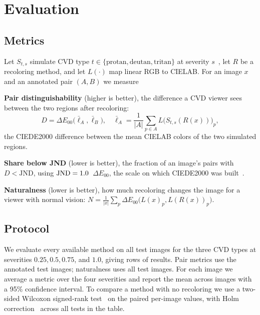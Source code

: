 \section{Evaluation}
\label{sec:evaluation}

\subsection{Metrics}
Let $S_{t,s}$ simulate CVD type $t\in\{\text{protan},\text{deutan},\text{tritan}\}$ at
severity $s$~\cite{machado2009}, let $R$ be a recoloring method, and let $L(\cdot)$ map linear
RGB to CIELAB. For an image $x$ and an annotated pair $(A,B)$ we measure

\noindent\textbf{Pair distinguishability} (higher is better), the difference a CVD viewer sees
between the two regions after recoloring:
\begin{equation}
  D = \Delta E_{00}\big(\bar{\ell}_A, \bar{\ell}_B\big),\quad
  \bar{\ell}_A = \frac{1}{|A|}\sum_{p\in A} L\big(S_{t,s}(R(x))\big)_p ,
\end{equation}
the CIEDE2000 difference between the mean CIELAB colors of the two simulated regions.

\noindent\textbf{Share below JND} (lower is better), the fraction of an image's pairs with
$D<\text{JND}$, using $\text{JND}=1.0$~$\Delta E_{00}$, the scale on which CIEDE2000 was
built~\cite{luo2001}.

\noindent\textbf{Naturalness} (lower is better), how much recoloring changes the image for a
viewer with normal vision:
$N = \frac{1}{|x|}\sum_{p} \Delta E_{00}\big(L(x)_p, L(R(x))_p\big)$.

\subsection{Protocol}
We evaluate every available method on all \NumTest{} test images for the three CVD types at
severities $0.25, 0.5, 0.75$, and $1.0$, giving \NumEvalRows{} rows of results. Pair metrics
use the \NumAnnotTest{} annotated test images; naturalness uses all test images. For each image
we average a metric over the four severities and report the mean across images with a 95\%
confidence interval. To compare a method with no recoloring we use a two-sided Wilcoxon
signed-rank test~\cite{wilcoxon1945} on the paired per-image values, with Holm
correction~\cite{holm1979} across all tests in the table.

